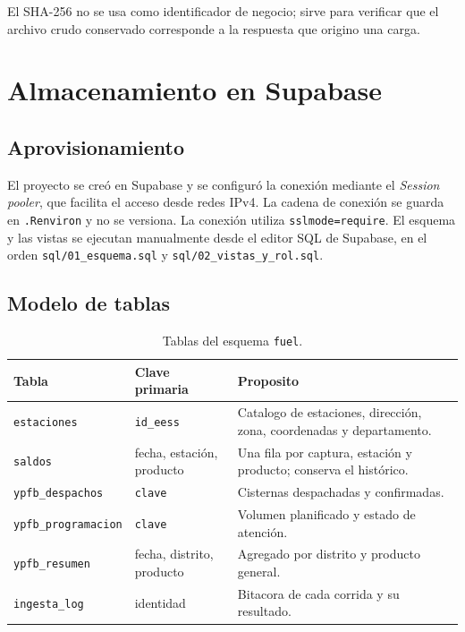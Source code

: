 \documentclass[12pt,a4paper]{article}
\newcommand{\fuel}{\texttt{fuel}}
\newcommand{\archivo}[1]{\texttt{#1}}
\begin{document}
El SHA-256 no se usa como identificador de negocio; sirve para verificar que el archivo crudo conservado corresponde a la respuesta que origino una carga.

\section{Almacenamiento en Supabase}\label{sec:supabase}

\subsection{Aprovisionamiento}

El proyecto se creó en Supabase y se configuró la conexión mediante el \emph{Session pooler}, que facilita el acceso desde redes IPv4. La cadena de conexión se guarda en \texttt{.Renviron} y no se versiona. La conexión utiliza \texttt{sslmode=require}. El esquema y las vistas se ejecutan manualmente desde el editor SQL de Supabase, en el orden \archivo{sql/01\_esquema.sql} y \archivo{sql/02\_vistas\_y\_rol.sql}.

\subsection{Modelo de tablas}

\begin{table}[H]
\centering
\small
\caption{Tablas del esquema \fuel{}.}
\label{tab:tablas}
\begin{tabularx}{\linewidth}{@{}l l X@{}}
\toprule
\textbf{Tabla} & \textbf{Clave primaria} & \textbf{Proposito} \\
\midrule
\texttt{estaciones} & \texttt{id\_eess} & Catalogo de estaciones, dirección, zona, coordenadas y departamento. \\
\texttt{saldos} & fecha, estación, producto & Una fila por captura, estación y producto; conserva el histórico. \\
\texttt{ypfb\_despachos} & \texttt{clave} & Cisternas despachadas y confirmadas. \\
\texttt{ypfb\_programacion} & \texttt{clave} & Volumen planificado y estado de atención. \\
\texttt{ypfb\_resumen} & fecha, distrito, producto & Agregado por distrito y producto general. \\
\texttt{ingesta\_log} & identidad & Bitacora de cada corrida y su resultado. \\
\bottomrule
\end{tabularx}
\end{table}
\end{document}
